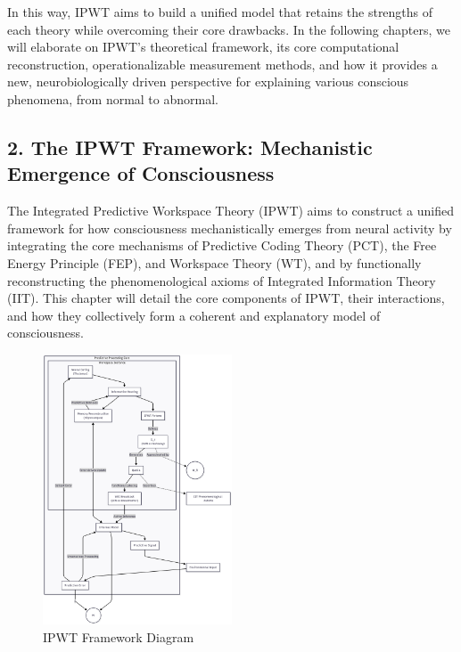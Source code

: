 \documentclass[
  a4paper]{article}
\begin{document}
In this way, IPWT aims to build a unified model that retains the
strengths of each theory while overcoming their core drawbacks. In the
following chapters, we will elaborate on IPWT's theoretical framework,
its core computational reconstruction, operationalizable measurement
methods, and how it provides a new, neurobiologically driven perspective
for explaining various conscious phenomena, from normal to abnormal.

\subsection{2. The IPWT Framework: Mechanistic Emergence of
Consciousness}\label{the-ipwt-framework-mechanistic-emergence-of-consciousness}

The Integrated Predictive Workspace Theory (IPWT) aims to construct a
unified framework for how consciousness mechanistically emerges from
neural activity by integrating the core mechanisms of Predictive Coding
Theory (PCT), the Free Energy Principle (FEP), and Workspace Theory
(WT), and by functionally reconstructing the phenomenological axioms of
Integrated Information Theory (IIT). This chapter will detail the core
components of IPWT, their interactions, and how they collectively form a
coherent and explanatory model of consciousness.

\begin{figure}
    \centering
    \includegraphics[width=0.5\textwidth]{../images/framework.png}
    \caption{IPWT Framework Diagram}
    \label{fig:framework}
\end{figure}
\end{document}
